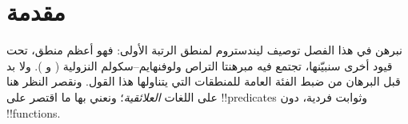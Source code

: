 \documentclass[../../../include/open-logic-section]{subfiles}
\begin{document}
\section{مقدمة}

نبرهن في هذا الفصل توصيف ليندستروم لمنطق الرتبة الأولى: فهو أعظم
منطق، تحت قيود أخرى سنبيّنها، تجتمع فيه مبرهنتا التراص
ولوفنهايم--سكولم النزولية
( و
). ولا بد قبل البرهان من ضبط
الفئة العامة للمنطقات التي يتناولها هذا القول. ونقصر النظر هنا على اللغات
\emph{العلائقية}؛ ونعني بها ما اقتصر على !!{predicate}s وثوابت
فردية، دون !!{function}s.
\end{document}
